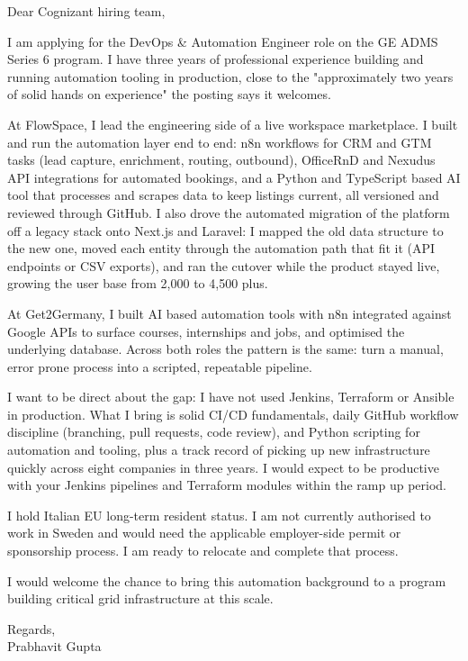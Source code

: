 \documentclass[a4paper,11pt]{article}
\begin{document}
Dear Cognizant hiring team,

I am applying for the DevOps \& Automation Engineer role on the GE ADMS Series 6 program. I have three years of professional experience building and running automation tooling in production, close to the "approximately two years of solid hands on experience" the posting says it welcomes.

At FlowSpace, I lead the engineering side of a live workspace marketplace. I built and run the automation layer end to end: n8n workflows for CRM and GTM tasks (lead capture, enrichment, routing, outbound), OfficeRnD and Nexudus API integrations for automated bookings, and a Python and TypeScript based AI tool that processes and scrapes data to keep listings current, all versioned and reviewed through GitHub. I also drove the automated migration of the platform off a legacy stack onto Next.js and Laravel: I mapped the old data structure to the new one, moved each entity through the automation path that fit it (API endpoints or CSV exports), and ran the cutover while the product stayed live, growing the user base from 2,000 to 4,500 plus.

At Get2Germany, I built AI based automation tools with n8n integrated against Google APIs to surface courses, internships and jobs, and optimised the underlying database. Across both roles the pattern is the same: turn a manual, error prone process into a scripted, repeatable pipeline.

I want to be direct about the gap: I have not used Jenkins, Terraform or Ansible in production. What I bring is solid CI/CD fundamentals, daily GitHub workflow discipline (branching, pull requests, code review), and Python scripting for automation and tooling, plus a track record of picking up new infrastructure quickly across eight companies in three years. I would expect to be productive with your Jenkins pipelines and Terraform modules within the ramp up period.

I hold Italian EU long-term resident status. I am not currently authorised to work in Sweden and would need the applicable employer-side permit or sponsorship process. I am ready to relocate and complete that process.

I would welcome the chance to bring this automation background to a program building critical grid infrastructure at this scale.

Regards,\\
Prabhavit Gupta
\end{document}
